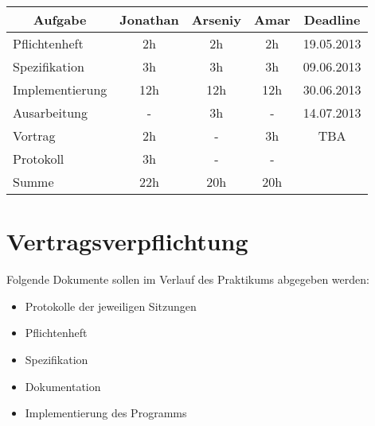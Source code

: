 \documentclass[12pt,a4paper]{article}
\begin{document}
\begin{center}
  \begin{tabular}{|*{5}{c|}}
    \hline
	Aufgabe & Jonathan & Arseniy & Amar & Deadline \\
    \hline
   	\multicolumn{1}{|l|}{Pflichtenheft} & 2h & 2h & 2h & 19.05.2013 \\
    \hline
    \multicolumn{1}{|l|}{Spezifikation} & 3h & 3h & 3h & 09.06.2013 \\
    \hline
    \multicolumn{1}{|l|}{Implementierung} & 12h & 12h & 12h & 30.06.2013 \\
    \hline
    \multicolumn{1}{|l|}{Ausarbeitung} & - & 3h & - & 14.07.2013 \\
    \hline
    \multicolumn{1}{|l|}{Vortrag} & 2h & - & 3h & TBA \\
    \hline
    \multicolumn{1}{|l|}{Protokoll} & 3h & - & - &  \\
    \hline
    \multicolumn{1}{|l|}{Summe} & 22h & 20h & 20h &  \\
    \hline
    
    
  \end{tabular}
\end{center}

\section{Vertragsverpflichtung}

Folgende Dokumente sollen im Verlauf des Praktikums abgegeben werden:
\begin{itemize}
\item Protokolle der jeweiligen Sitzungen
\item Pflichtenheft
\item Spezifikation
\item Dokumentation
\item Implementierung des Programms 
\end{itemize}
\end{document}
